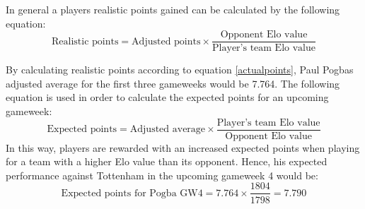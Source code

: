 In general a players realistic points gained can be calculated by the following equation: 
\begin{equation} \label{actualpoints}
\textrm{Realistic points} = \textrm{Adjusted points} \times \frac{\textrm{Opponent Elo value}}{\textrm{Player's team Elo value}}    
\end{equation}

By calculating realistic points according to equation \ref{actualpoints}, Paul Pogbas adjusted average for the first three gameweeks would be 7.764. The following equation is used in order to calculate the expected points for an upcoming gameweek: 
\begin{equation}
    \textrm{Expected points} = \textrm{Adjusted average} \times \frac{\textrm{Player's team Elo value}}{\textrm{Opponent Elo value}}
\end{equation}
In this way, players are rewarded with an increased expected points when playing for a team with a higher Elo value than its opponent. Hence, his expected performance against Tottenham in the upcoming gameweek 4 would be: 
\begin{equation*}
    \textrm{Expected points for Pogba GW4} = 7.764 \times \frac{1804}{1798} = 7.790
\end{equation*}


